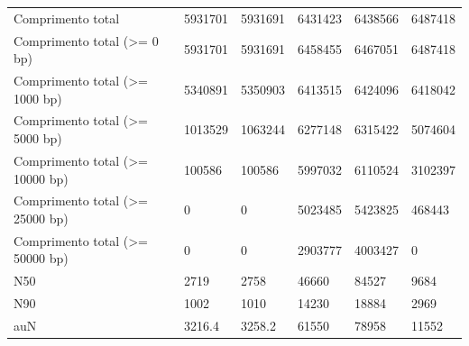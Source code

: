 \begin{table}[htb]
{{\begin{tabular}{llllll}
		Comprimento total                            & 5931701                                & 5931691                                 & 6431423                           & 6438566                               & 6487418                         \\
		Comprimento total (\textgreater{}= 0 bp)     & 5931701                                & 5931691                                 & 6458455                           & 6467051                               & 6487418                         \\
		Comprimento total (\textgreater{}= 1000 bp)  & 5340891                                & 5350903                                 & 6413515                           & 6424096                               & 6418042                         \\
		Comprimento total (\textgreater{}= 5000 bp)  & 1013529                                & 1063244                                 & 6277148                           & 6315422                               & 5074604                         \\
		Comprimento total (\textgreater{}= 10000 bp) & 100586                                 & 100586                                  & 5997032                           & 6110524                               & 3102397                         \\
		Comprimento total (\textgreater{}= 25000 bp) & 0                                      & 0                                       & 5023485                           & 5423825                               & 468443                          \\
		Comprimento total (\textgreater{}= 50000 bp) & 0                                      & 0                                       & 2903777                           & 4003427                               & 0                               \\
		N50                                          & 2719                                   & 2758                                    & 46660                             & 84527                                 & 9684                            \\
		N90                                          & 1002                                   & 1010                                    & 14230                             & 18884                                 & 2969                            \\
		auN                                          & 3216.4                                 & 3258.2                                  & 61550                             & 78958                                 & 11552                           \\

\end{tabular}}}
\end{table}
